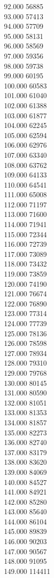 { 92.000	56885 \\
 93.000	57413 \\
 94.000	57709 \\
 95.000	58131 \\
 96.000	58569 \\
 97.000	59356 \\
 98.000	59738 \\
 99.000	60195 \\
 100.000	60583 \\
 101.000	61040 \\
 102.000	61388 \\
 103.000	61877 \\
 104.000	62245 \\
 105.000	62594 \\
 106.000	62976 \\
 107.000	63340 \\
 108.000	63762 \\
 109.000	64133 \\
 110.000	64541 \\
 111.000	65008 \\
 112.000	71197 \\
 113.000	71600 \\
 114.000	71941 \\
 115.000	72344 \\
 116.000	72739 \\
 117.000	73089 \\
 118.000	73432 \\
 119.000	73859 \\
 120.000	74190 \\
 121.000	76674 \\
 122.000	76890 \\
 123.000	77314 \\
 124.000	77739 \\
 125.000	78136 \\
 126.000	78598 \\
 127.000	78934 \\
 128.000	79310 \\
 129.000	79768 \\
 130.000	80145 \\
 131.000	80590 \\
 132.000	81051 \\
 133.000	81353 \\
 134.000	81857 \\
 135.000	82273 \\
 136.000	82740 \\
 137.000	83179 \\
 138.000	83620 \\
 139.000	84069 \\
 140.000	84527 \\
 141.000	84921 \\
 142.000	85280 \\
 143.000	85640 \\
 144.000	86104 \\
 145.000	89839 \\
 146.000	90203 \\
 147.000	90567 \\
 148.000	91095 \\
 149.000	114411 \\
}
